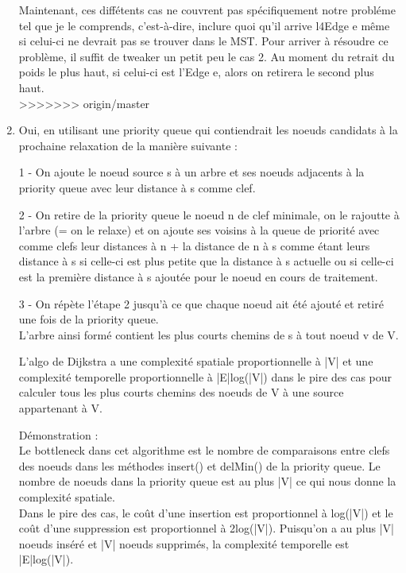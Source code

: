 \documentclass[11pt]{article}
\begin{document}
\begin{enumerate}
Maintenant, ces diffétents cas ne couvrent pas spécifiquement notre probléme tel que je le comprends, c’est-à-dire, inclure quoi qu’il arrive l4Edge e même si celui-ci ne devrait pas se trouver dans le MST. Pour arriver à résoudre ce problème, il suffit de tweaker un petit peu le cas 2. Au moment du retrait du poids le plus haut, si celui-ci est l’Edge e, alors on retirera le second plus haut.\\
>>>>>>> origin/master


\item Oui, en utilisant une priority queue qui contiendrait les noeuds candidats à la prochaine
relaxation de la manière suivante :\\
\par 1 - On ajoute le noeud source s à un arbre et ses noeuds adjacents à la priority 
queue avec leur distance à s comme clef.\\
\par 2 - On retire de la priority queue le noeud n de clef minimale, on le rajoutte
 à l'arbre (= on le relaxe) et on ajoute ses voisins à la queue de priorité avec comme
 clefs leur distances à n + la distance de n à s comme étant leurs distance à s si 
 celle-ci est plus petite que la distance à s actuelle ou si celle-ci est la première
 distance à s ajoutée pour le noeud en cours de traitement.\\
\par 3 - On répète l'étape 2 jusqu'à ce que chaque noeud ait été ajouté et retiré une fois
 de la priority queue.\\
L'arbre ainsi formé contient les plus courts chemins de s à tout noeud v de V.\\
\par L'algo de Dijkstra a une complexité spatiale proportionnelle à |V| et une complexité
 temporelle proportionnelle à |E|log(|V|) dans le pire des cas pour calculer tous les 
 plus courts chemins des noeuds de V à une source appartenant à V.
\par Démonstration :\\
Le bottleneck dans cet algorithme est le nombre de comparaisons entre clefs des noeuds
 dans les méthodes insert() et delMin() de la priority queue. Le nombre de noeuds dans 
 la priority queue est au plus |V| ce qui nous donne la complexité spatiale.\\
 Dans le pire des cas, le coût d'une insertion est proportionnel à log(|V|) et le coût
 d'une suppression est proportionnel à 2log(|V|). Puisqu'on a au plus |V| noeuds inséré
 et |V| noeuds supprimés, la complexité temporelle est |E|log(|V|).\\


\end{enumerate}
\end{document}
